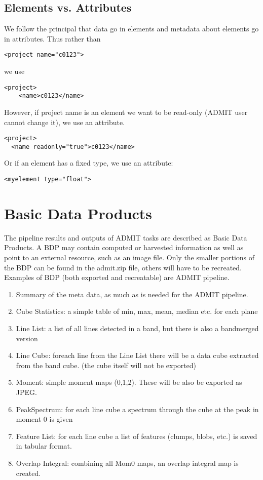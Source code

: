 \documentclass{report}
\begin{document}
\subsection{Elements vs. Attributes}
We follow the principal that data go in elements and metadata about
elements go in attributes.   Thus rather than

\begin{verbatim}
<project name="c0123">  
\end{verbatim}

\noindent we use 

\begin{verbatim}
<project>
    <name>c0123</name>
\end{verbatim}

\noindent However, if project name is an element we want to
be read-only (ADMIT user cannot change it), we use an attribute.

\begin{verbatim}
<project>
  <name readonly="true">c0123</name>
\end{verbatim}

\noindent Or if an element has a fixed type, we use an attribute:
\begin{verbatim}
<myelement type="float">
\end{verbatim}

\section{Basic Data Products}

The pipeline results and outputs of ADMIT tasks are described as 
Basic Data Products. A BDP may contain computed or harvested information
as well as point to an external resource, such as an image file.
Only the smaller portions of the BDP can be found
in the admit.zip file, others will have to be recreated. 
%
Examples of BDP (both exported and recreatable) are
ADMIT pipeline. 

\begin{enumerate}
\item
Summary of the meta data, as much as is needed for the ADMIT pipeline.
\item
Cube Statistics: a simple table of min, max, mean, median etc. for each plane
\item
Line List: a list of all lines detected in a band, but there is also a bandmerged version
\item
Line Cube: foreach line from the Line List there will be a data cube extracted from the
band cube.  (the cube itself will not be exported)
\item
Moment: simple moment maps (0,1,2). These will be also be exported as JPEG.
\item
PeakSpectrum: for each line cube a spectrum through the cube at the peak in moment-0 is given
\item
Feature List: for each line cube a list of features (clumps, blobs, etc.) is saved in tabular format.
\item 
Overlap Integral: combining all Mom0 maps, an overlap integral map is created.
\end{enumerate}
\end{document}
